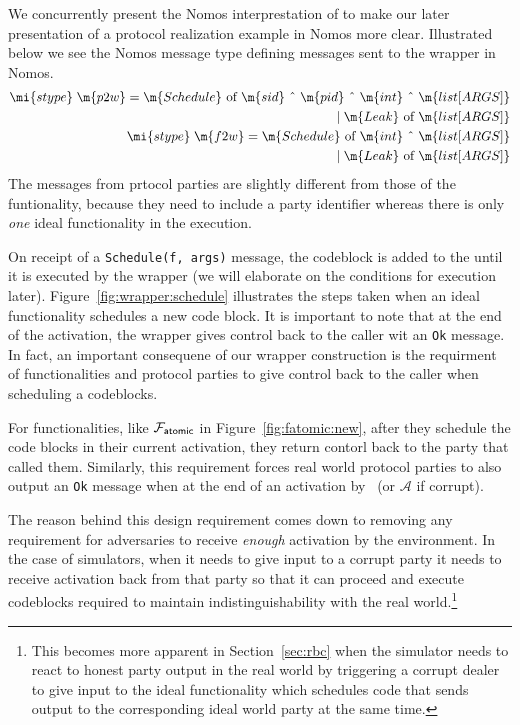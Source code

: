 We concurrently present the Nomos interprestation of \Wasync to make our later presentation of a protocol realization example in Nomos more clear.
Illustrated below we see the Nomos message type defining  messages sent to the wrapper in Nomos.
\begin{align*}
\mi{stype} \; \m{p2w} = \m{Schedule} \text{ of } \m{sid} \text{ \^{} } \m{pid} \text{ \^{} } \m{int} \text{ \^{} } \m{list[ARGS]} \\
| \; \m{Leak} \text{ of } \m{list[ARGS]}  \\
\mi{stype} \; \m{f2w} = \m{Schedule} \text{ of } \m{int} \text{ \^{} } \m{list[ARGS]} \\ 
| \; \m{Leak} \text{ of } \m{list[ARGS]}
\end{align*}
The  messages from prtocol parties are slightly different from those of the funtionality, because they need to include a party identifier whereas there is only \textit{one} ideal functionality in the execution.

On receipt of a \texttt{Schedule(f, args)} message, the codeblock is added to the  until it is executed by the wrapper (we will elaborate on the conditions for execution later). 
Figure~\ref{fig:wrapper:schedule} illustrates the steps taken when an ideal functionality schedules a new code block.
It is important to note that at the end of the activation, the wrapper gives control back to the caller wit an \texttt{Ok} message.
In fact, an important consequene of our wrapper construction is the requirment of functionalities and protocol parties to give control back to the caller when scheduling a codeblocks.

For functionalities, like $\mathcal{F}_{{\mathsf {atomic}}}$ in Figure~\ref{fig:fatomic:new}, after they schedule the code blocks in their current activation, they return contorl back to the party that called them.
Similarly, this requirement forces real world protocol parties to also output an \texttt{Ok} message when at the end of an activation by \Environment~(or $\mathcal{A}$ if corrupt).

The reason behind this design requirement comes down to removing any requirement for adversaries to receive \textit{enough} activation by the environment.
In the case of simulators, when it needs to give input to a corrupt party it needs to receive activation back from that party so that it can proceed and execute codeblocks required to maintain indistinguishability with the real world.\footnote{This becomes more apparent in Section~\ref{sec:rbc} when the simulator needs to react to honest party output in the real world by triggering a corrupt dealer to give input to the ideal functionality which schedules code that sends output to the corresponding ideal world party at the same time.}

